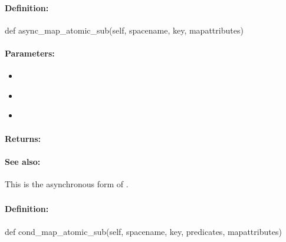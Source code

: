 \paragraph{Definition:}
\begin{pythoncode}
def async_map_atomic_sub(self, spacename, key, mapattributes)
\end{pythoncode}

\paragraph{Parameters:}
\begin{itemize}[noitemsep]
\item {}\\

\item {}\\

\item {}\\

\end{itemize}

\paragraph{Returns:}


\paragraph{See also:}  This is the asynchronous form of .

\pagebreak
\subsubsection{}
\label{api:python:cond_map_atomic_sub}


\paragraph{Definition:}
\begin{pythoncode}
def cond_map_atomic_sub(self, spacename, key, predicates, mapattributes)
\end{pythoncode}

